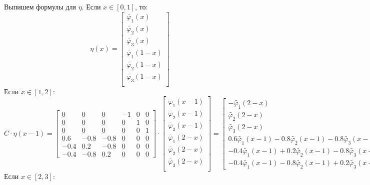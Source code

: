 \documentclass[a4paper, 12pt,fleqn]{extarticle}
\begin{document}
Выпишем формулы для $\eta$. Если $x \in [0,1]$, то:
\[\eta(x)=
\begin{bmatrix}
    \tilde{\varphi_1}(x)\\
    \tilde{\varphi_2}(x)\\
    \tilde{\varphi_3}(x)\\
    \tilde{\varphi_1}(1-x)\\
    \tilde{\varphi_2}(1-x)\\
    \tilde{\varphi_3}(1-x)\\
\end{bmatrix}
    \]
    Если $x \in [1,2]$:
    \[C\cdot \eta(x-1)=\begin{bmatrix}
        0& 0& 0& -1& 0& 0\\ 
        0& 0& 0& 0& 1& 0\\ 
        0& 0& 0& 0& 0& 1\\ 
        0.6& -0.8& -0.8& 0& 0& 0\\ 
        -0.4& 0.2& -0.8& 0& 0& 0\\ 
        -0.4& -0.8& 0.2& 0& 0& 0
        \end{bmatrix}\cdot
        \begin{bmatrix}
            \tilde{\varphi_1}(x-1)\\%
            \tilde{\varphi_2}(x-1)\\%
            \tilde{\varphi_3}(x-1)\\%
            \tilde{\varphi_1}(2-x)\\%
            \tilde{\varphi_2}(2-x)\\%
            \tilde{\varphi_3}(2-x)\\%
        \end{bmatrix}
        =\begin{bmatrix}
            -\tilde{\varphi_1}(2-x)\\
            \tilde{\varphi_2}(2-x)\\
            \tilde{\varphi_3}(2-x)\\
            0.6\tilde{\varphi_1}(x-1)-0.8\tilde{\varphi_2}(x-1)-0.8\tilde{\varphi_3}(x-1)\\
            -0.4\tilde{\varphi_1}(x-1)+0.2\tilde{\varphi_2}(x-1)-0.8\tilde{\varphi_3}(x-1)\\
            -0.4\tilde{\varphi_1}(x-1)-0.8\tilde{\varphi_2}(x-1)+0.2\tilde{\varphi_3}(x-1)
        \end{bmatrix}\]
        Если $x \in [2,3]$:
\end{document}
